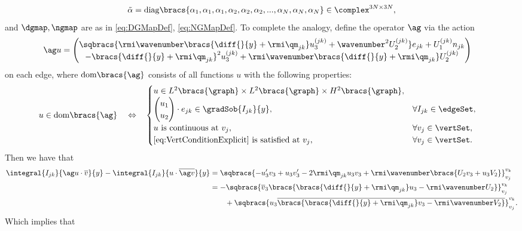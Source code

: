 \begin{align*}
	\tilde{\alpha} = 
	\mathrm{diag}\bracs{\alpha_1, \alpha_1, \alpha_1, \alpha_2, \alpha_2, \alpha_2, ..., \alpha_N, \alpha_N, \alpha_N} \in \complex^{3N\times 3N},
\end{align*}
and $\dgmap, \ngmap$ are as in \eqref{eq:DGMapDef}, \eqref{eq:NGMapDef}.
To complete the analogy, define the operator $\ag$ via the action
\begin{align*}
	\ag u &= 
	\begin{pmatrix}
		\sqbracs{ \rmi\wavenumber\bracs{\diff{}{y} + \rmi\qm_{jk} }u_3^{(jk)} + \wavenumber^2 U_2^{(jk)} }e_{jk}
		+ U_1^{(jk)} n_{jk} \\
		- \bracs{\diff{}{y} + \rmi\qm_{jk} }^2 u_3^{(jk)} + \rmi\wavenumber \bracs{\diff{}{y} + \rmi\qm_{jk} }U_2^{(jk)}
	\end{pmatrix}
\end{align*}
on each edge, where $\mathrm{dom}\bracs{\ag}$ consists of all functions $u$ with the following properties:
\begin{align*}
	u\in\mathrm{dom}\bracs{\ag} \quad\Leftrightarrow\quad &
	\begin{cases}
	u\in L^2\bracs{\graph}\times L^2\bracs{\graph}\times H^2\bracs{\graph}, \\
	\begin{pmatrix} u_1 \\ u_2 \end{pmatrix}\cdot e_{jk}\in \gradSob{I_{jk}}{y}, & \forall I_{jk}\in\edgeSet, \\
	u \text{ is continuous at } v_j, & \forall v_j\in\vertSet, \\
	\text{\eqref{eq:VertConditionExplicit} is satisfied at } v_j, & \forall v_j\in\vertSet.
	\end{cases}
\end{align*}
Then we have that
\begin{align*}
	\integral{I_{jk}}{ \ag u \cdot \overline{v} }{y} - \integral{I_{jk}}{ u \cdot \overline{\ag v} }{y}
	&= \sqbracs{ -u'_3 v_3 + u_3 v_3' - 2\rmi\qm_{jk}u_3 v_3 + \rmi\wavenumber\bracs{U_2 v_3 + u_3 V_2} }_{v_j}^{v_k} \\
	&= -\sqbracs{ \overline{v}_3\bracs{ \bracs{\diff{}{y} + \rmi\qm_{jk} }u_3 - \rmi\wavenumber U_2 } }_{v_j}^{v_k} \\
	&\qquad + \sqbracs{ u_3\overline{\bracs{ \bracs{\diff{}{y} + \rmi\qm_{jk} }v_3 - \rmi\wavenumber V_2 }} }_{v_j}^{v_k}.
\end{align*}
Which implies that
